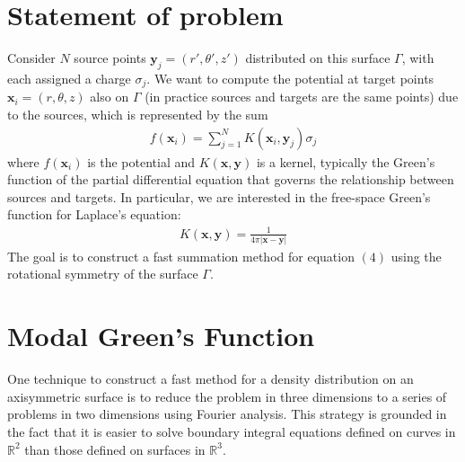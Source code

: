 \documentclass[11pt, oneside]{article}   	%
\begin{document}
\section{Statement of problem}
Consider $N$ source points $\mathbf{y}_j=(r',\theta',z')$ distributed on this surface $\Gamma$, with each assigned a charge $\sigma_j$. We want to compute the potential at target points $\mathbf{x}_i=(r,\theta,z)$ also on $\Gamma$ (in practice sources and targets are the same points) due to the sources, which is represented by the sum
\begin{align}
f(\mathbf{x}_i) = \sum_{j=1}^N K(\mathbf{x}_i,\mathbf{y}_j)\sigma_j
\end{align}
where $f(\mathbf{x}_i)$ is the potential and $K(\mathbf{x},\mathbf{y})$ is a kernel, typically the Green's function of the partial differential equation that governs the relationship between sources and targets. In particular, we are interested in the free-space Green's function for Laplace's equation:
\begin{align}
K(\mathbf{x},\mathbf{y}) = \frac{1}{4\pi |\mathbf{x}-\mathbf{y}|}
\end{align}
The goal is to construct a fast summation method for equation $(4)$ using the rotational symmetry of the surface $\Gamma$.

\section{Modal Green's Function}

One technique to construct a fast method for a density distribution on an axisymmetric surface is to reduce the problem in three dimensions to a series of problems in two dimensions using Fourier analysis. This strategy is grounded in the fact that it is easier to solve boundary integral equations defined on curves in $\mathbb{R}^2$ than those defined on surfaces in $\mathbb{R}^3$.
\end{document}
